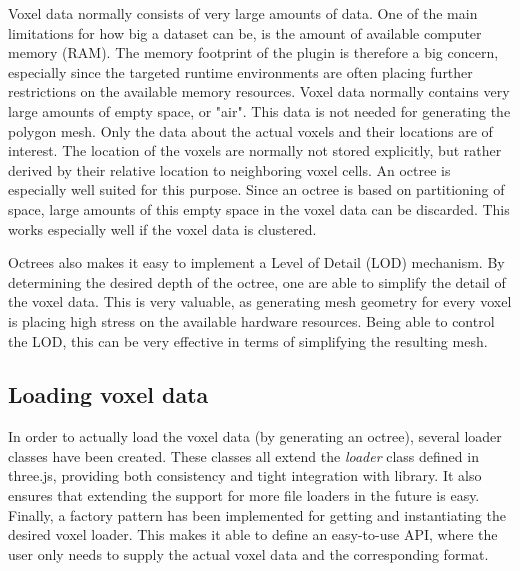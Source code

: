 Voxel data normally consists of very large amounts of data. One of the main limitations for how big a dataset can be, is the amount of available computer memory (RAM). The memory footprint of the plugin is therefore a big concern, especially since the targeted runtime environments are often placing further restrictions on the available memory resources. Voxel data normally contains very large amounts of empty space, or "air". This data is not needed for generating the polygon mesh. Only the data about the actual voxels and their locations are of interest. The location of the voxels are normally not stored explicitly, but rather derived by their relative location to neighboring voxel cells. An octree is especially well suited for this purpose. Since an octree is based on partitioning of space, large amounts of this empty space in the voxel data can be discarded. This works especially well if the voxel data is clustered.

Octrees also makes it easy to implement a Level of Detail (LOD) mechanism. By determining the desired depth of the octree, one are able to simplify the detail of the voxel data. This is very valuable, as generating mesh geometry for every voxel is placing high stress on the available hardware resources. Being able to control the LOD, this can be very effective in terms of simplifying the resulting mesh.

\subsection{Loading voxel data}
In order to actually load the voxel data (by generating an octree), several loader classes have been created. These classes all extend the \textit{loader} class defined in three.js, providing both consistency and tight integration with library. It also ensures that extending the support for more file loaders in the future is easy. Finally, a factory pattern has been implemented for getting and instantiating the desired voxel loader. This makes it able to define an easy-to-use API, where the user only needs to supply the actual voxel data and the corresponding format.


